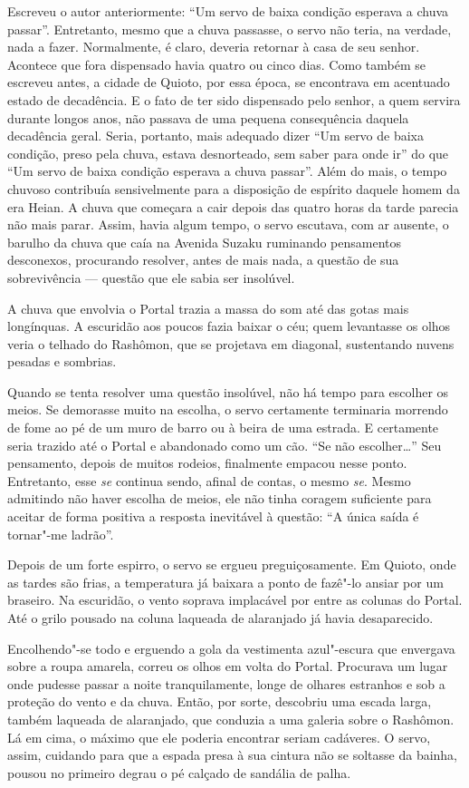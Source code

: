 Escreveu o autor anteriormente: ``Um servo de baixa condição esperava a
chuva passar''. Entretanto, mesmo que a chuva passasse, o servo não
teria, na verdade, nada a fazer. Normalmente, é claro, deveria retornar
à casa de seu senhor. Acontece que fora dispensado havia quatro ou
cinco dias. Como também se escreveu antes, a cidade de Quioto, por essa
época, se encontrava em acentuado estado de decadência. E o fato de ter
sido dispensado pelo senhor, a quem servira durante longos anos, não
passava de uma pequena consequência daquela decadência geral. Seria,
portanto, mais adequado dizer ``Um servo de baixa condição, preso pela
chuva, estava desnorteado, sem saber para onde ir'' do que ``Um servo de
baixa condição esperava a chuva passar''. Além do mais, o tempo chuvoso
contribuía sensivelmente para a disposição de espírito daquele homem da
era Heian. A chuva que começara a cair depois das quatro horas da tarde
parecia não mais parar. Assim, havia algum tempo, o servo escutava, com
ar ausente, o barulho da chuva que caía na Avenida Suzaku ruminando
pensamentos desconexos, procurando resolver, antes de mais nada, a
questão de sua sobrevivência --- questão que ele sabia ser insolúvel.

A chuva que envolvia o Portal trazia a massa do som até das gotas mais
longínquas. A escuridão aos poucos fazia baixar o céu; quem levantasse
os olhos veria o telhado do Rashômon, que se projetava em diagonal,
sustentando nuvens pesadas e sombrias.

Quando se tenta resolver uma questão insolúvel, não há tempo para
escolher os meios. Se demorasse muito na escolha, o servo certamente
terminaria morrendo de fome ao pé de um muro de barro ou à beira de uma
estrada. E certamente seria trazido até o Portal e abandonado como um
cão. ``Se não escolher\ldots{}'' Seu pensamento, depois de muitos rodeios,
finalmente empacou nesse ponto. Entretanto, esse \textit{se} continua sendo,
afinal de contas, o mesmo \textit{se}. Mesmo admitindo não haver escolha de
meios, ele não tinha coragem suficiente para aceitar de forma positiva
a resposta inevitável à questão: ``A única saída é tornar"-me ladrão''.

Depois de um forte espirro, o servo se ergueu preguiçosamente. Em
Quioto, onde as tardes são frias, a temperatura já baixara a ponto de
fazê"-lo ansiar por um braseiro. Na escuridão, o vento soprava
implacável por entre as colunas do Portal. Até o grilo pousado na
coluna laqueada de alaranjado já havia desaparecido.

Encolhendo"-se todo e erguendo a gola da vestimenta azul"-escura que
envergava sobre a roupa amarela, correu os olhos em volta do Portal.
Procurava um lugar onde pudesse passar a noite tranquilamente, longe de
olhares estranhos e sob a proteção do vento e da chuva. Então, por
sorte, descobriu uma escada larga, também laqueada de alaranjado, que
conduzia a uma galeria sobre o Rashômon. Lá em cima, o máximo que ele
poderia encontrar seriam cadáveres. O servo, assim, cuidando para que a
espada presa à sua cintura não se soltasse da bainha, pousou no
primeiro degrau o pé calçado de sandália de palha.

